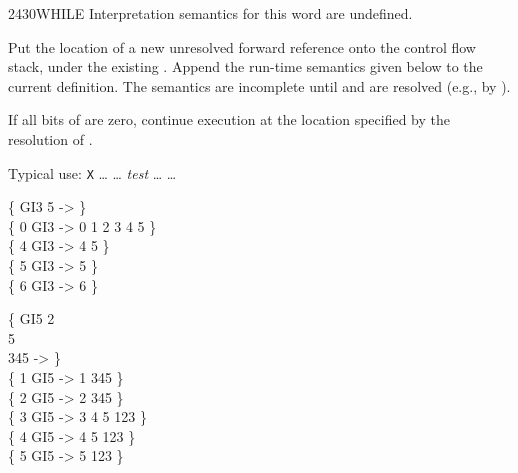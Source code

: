 \begin{worddef}{2430}{WHILE}
\interpret
	Interpretation semantics for this word are undefined.

\compile

	Put the location of a new unresolved forward reference
	 onto the control flow stack, under the existing
	. Append the run-time semantics given below to the
	current definition. The semantics are incomplete until
	 and  are resolved (e.g., by
	).

\runtime

	If all bits of  are zero, continue execution at the
	location specified by the resolution of .

	\begin{defer}
	\rationale %
		Typical use:
			\word{:} \texttt{X} {\ldots}
				 {\ldots}
				\emph{test} 
				{\ldots} 
			{\ldots} \word{;}

	\testing
		\{ \word{:} GI3   5      \word{;} -> \} \\
		\{ 0 GI3 -> 0 1 2 3 4 5 \} \\
		\{ 4 GI3 -> 4 5 \} \\
		\{ 5 GI3 -> 5 \} \\
		\{ 6 GI3 -> 6 \}

		\{ \word{:} GI5   2   \\
		\tab[2]  5      \\
		  345  \word{;} -> \} \\
		\{ 1 GI5 -> 1 345 \} \\
		\{ 2 GI5 -> 2 345 \} \\
		\{ 3 GI5 -> 3 4 5 123 \} \\
		\{ 4 GI5 -> 4 5 123 \} \\
		\{ 5 GI5 -> 5 123 \}
	\end{defer}
\end{worddef}



